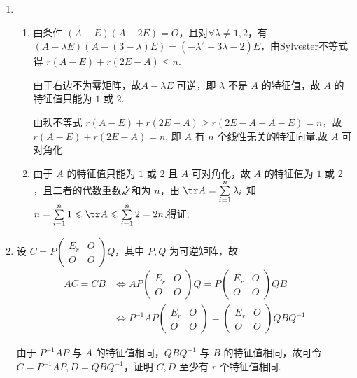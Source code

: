 \begin{enumerate}
    \item
    \begin{enumerate}
        \item 由条件 \(\left(A-E\right)\left(A-2E\right)=O\)，且对\(\forall \lambda \neq 1,2\)，有 \(\left(A-\lambda E\right)\left(A-\left(3-\lambda\right)E\right)=\left(-\lambda^2+3\lambda-2\right)E\)，由Sylvester不等式得 \(r(A-E)+r(2E-A) \leqslant n\).

        由于右边不为零矩阵，故\(A-\lambda E\) 可逆，即 \(\lambda\) 不是 \(A\) 的特征值，故 \(A\) 的特征值只能为 \(1\) 或 \(2\).

        由秩不等式 \(r(A-E)+r(2E-A)\geqslant r(2E-A + A-E)=n\)，故 \(r(A-E)+r(2E-A)=n\), 即 \(A\) 有 \(n\) 个线性无关的特征向量.故 \(A\) 可对角化.

        \item 由于 \(A\) 的特征值只能为 \(1\) 或 \(2\) 且 \(A\) 可对角化，故 \(A\) 的特征值为 \(1\) 或 \(2\) ，且二者的代数重数之和为 \(n\)，由 \(\tr A=\sum\limits_{i=1}^n \lambda_i\) 知 \(n=\sum\limits_{i=1}^n 1 \leqslant \tr A \leqslant \sum\limits_{i=1}^n 2=2n\).得证.
    \end{enumerate}

    \item
    设 \(C=P\begin{pmatrix}
        E_r & O\\
        O & O
        \end{pmatrix}Q\)，其中 \(P,Q\) 为可逆矩阵，故
    \begin{align*}
        AC=CB &\iff AP\begin{pmatrix}E_r & O\\O & O\end{pmatrix}Q=P\begin{pmatrix}E_r & O\\O & O\end{pmatrix}QB \\
        &\iff P^{-1}AP\begin{pmatrix}E_r & O\\O & O\end{pmatrix}=\begin{pmatrix}E_r & O\\O & O\end{pmatrix}QBQ^{-1}
    \end{align*}

    由于 \(P^{-1}AP\) 与 \(A\) 的特征值相同，\(QBQ^{-1}\) 与 \(B\) 的特征值相同，故可令 \(C=P^{-1}AP,\allowbreak D=QBQ^{-1}\)，证明 \(C,D\) 至少有 \(r\) 个特征值相同.


\end{enumerate}
